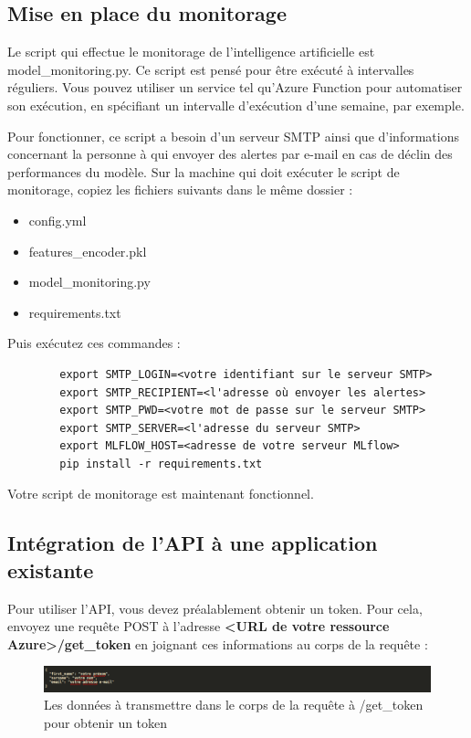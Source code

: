 \documentclass[french]{article}
\begin{document}
    \subsection{Mise en place du monitorage}

    Le script qui effectue le monitorage de l'intelligence artificielle est model\_monitoring.py. Ce script est pensé pour être exécuté à intervalles réguliers. Vous pouvez utiliser un service tel qu'Azure Function pour automatiser son exécution, en spécifiant un intervalle d'exécution d'une semaine, par exemple.

    Pour fonctionner, ce script a besoin d'un serveur SMTP ainsi que d'informations concernant la personne à qui envoyer des alertes par e-mail en cas de déclin des performances du modèle. Sur la machine qui doit exécuter le script de monitorage, copiez les fichiers suivants dans le même dossier :
    \begin{itemize}
        \item config.yml
        \item features\_encoder.pkl
        \item model\_monitoring.py
        \item requirements.txt
    \end{itemize}

    Puis exécutez ces commandes :
    \begin{verbatim}
        export SMTP_LOGIN=<votre identifiant sur le serveur SMTP>
        export SMTP_RECIPIENT=<l'adresse où envoyer les alertes>
        export SMTP_PWD=<votre mot de passe sur le serveur SMTP>
        export SMTP_SERVER=<l'adresse du serveur SMTP>
        export MLFLOW_HOST=<adresse de votre serveur MLflow>
        pip install -r requirements.txt
    \end{verbatim}
    
    Votre script de monitorage est maintenant fonctionnel.
    
    \subsection{Intégration de l'API à une application existante}

    Pour utiliser l'API, vous devez préalablement obtenir un token. Pour cela, envoyez une requête POST à l'adresse \textbf{<URL de votre ressource Azure>/get\_token} en joignant ces informations au corps de la requête :

    \begin{figure}[h]
        \includegraphics[width=12cm]{azure_3}
        \centering
        \caption{Les données à transmettre dans le corps de la requête à /get\_token pour obtenir un token}
    \end{figure}
\end{document}
